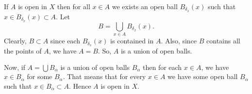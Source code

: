
\begin{solution}
    If $A$ is open in $X$ then for all $x\in A$ we exists
    an open ball $B_{\delta_x}(x)$ such that
    $x\in B_{\delta_x}(x)\subset A$.
    Let $$B=\bigcup_{x\in A}{B_{\delta_x}(x)}.$$
    Clearly, $B\subset A$ since each $B_{\delta_x}(x)$
    is contained in $A$. Also, since $B$ contains all the
    points of $A$, we have $A=B$. So, $A$ is a union
    of open balls.
    
    \vspace*{3mm}
    Now, if $A=\bigcup{B_\alpha}$ is a union of open
    balls $B_\alpha$ then
    for each $x\in A$, we have $x \in B_\alpha$ for some
    $B_\alpha$. That means that for every $x\in A$ we have
    some open ball $B_\alpha$ such that
    $x\in B_\alpha\subset A$. Hence $A$ is open in $X$.
\end{solution}